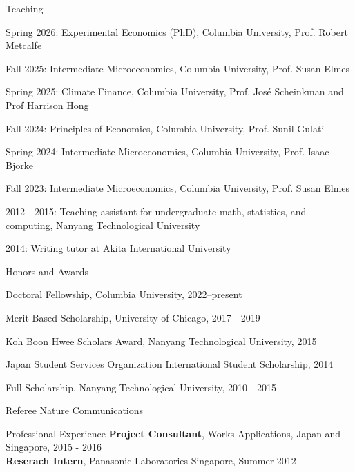 \documentclass{resume} %
\begin{document}
\begin{rSection}{Teaching} \itemsep -4pt
\item Spring 2026: Experimental Economics (PhD), Columbia University, Prof. Robert Metcalfe
\item Fall 2025: Intermediate Microeconomics, Columbia University, Prof. Susan Elmes
\item Spring 2025: Climate Finance, Columbia University, Prof. José Scheinkman and Prof Harrison Hong
\item Fall 2024: Principles of Economics, Columbia University, Prof. Sunil Gulati
\item Spring 2024: Intermediate Microeconomics, Columbia University, Prof. Isaac Bjorke 
\item Fall 2023: Intermediate Microeconomics, Columbia University, Prof. Susan Elmes 
\item 2012 - 2015: Teaching assistant for undergraduate math, statistics, and computing, Nanyang Technological University
\item 2014: Writing tutor at Akita International University
\end{rSection}



\begin{rSection}{Honors and Awards} \itemsep -4pt
\item Doctoral Fellowship, Columbia University, 2022–present
\item Merit-Based Scholarship, University of Chicago, 2017 - 2019 
\item Koh Boon Hwee Scholars Award, Nanyang Technological University, 2015
\item Japan Student Services Organization International Student Scholarship, 2014
\item Full Scholarship, Nanyang Technological University, 2010 - 2015
\end{rSection}


\begin{rSection}{Referee}
Nature Communications 
\end{rSection}

\begin{rSection}{Professional Experience}
{\bf Project Consultant}, Works Applications, Japan and Singapore, 2015 - 2016 \\
{\bf Reserach Intern}, Panasonic Laboratories Singapore, Summer 2012
\end{rSection}
\end{document}
